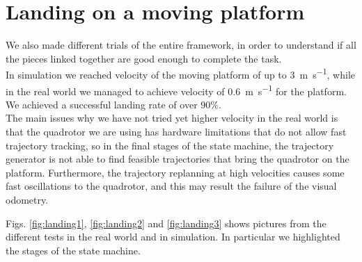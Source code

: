 \section{Landing on a moving platform}
We also made different trials of the entire framework, in order to understand if all the pieces linked together are good enough to complete the task.\\
In simulation we reached velocity of the moving platform of up to \SI{3}{\meter \per \second}, while in the real world we managed to achieve velocity of \SI{0.6}{\meter \per \second} for the platform. \\
We achieved a successful landing rate of over $90\%$.\\
The main issues why we have not tried yet higher velocity in the real world is that the quadrotor we are using has hardware limitations that do not allow fast trajectory tracking, so in the final stages of the state machine, the trajectory generator is not able to find feasible trajectories that bring the quadrotor on the platform. Furthermore, the trajectory replanning at high velocities causes some fast oscillations to the quadrotor, and this may result the failure of the visual odometry. 

Figs. \ref{fig:landing1},  \ref{fig:landing2} and  \ref{fig:landing3}  shows pictures from the different tests in the real world and in simulation. In particular we highlighted the stages of the state machine.


